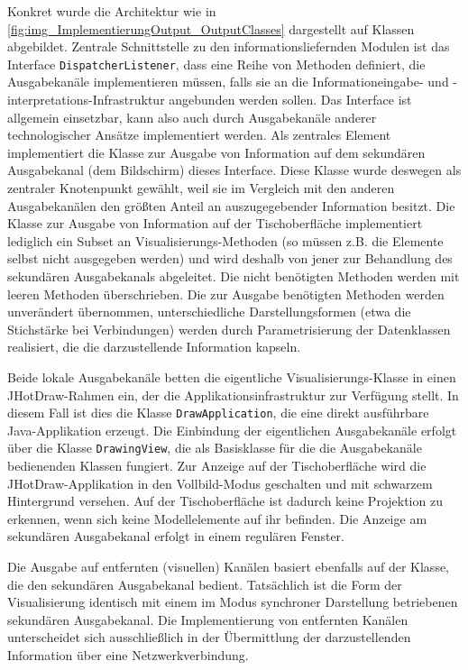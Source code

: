 Konkret wurde die Architektur wie in \ref{fig:img_ImplementierungOutput_OutputClasses} dargestellt auf Klassen abgebildet. Zentrale Schnittstelle zu den informationsliefernden Modulen ist das Interface \texttt{DispatcherListener}, dass eine Reihe von Methoden definiert, die Ausgabekanäle implementieren müssen, falls sie an die Informationeingabe- und -interpretations-Infrastruktur angebunden werden sollen. Das Interface ist allgemein einsetzbar, kann also auch durch Ausgabekanäle anderer technologischer Ansätze implementiert werden. Als zentrales Element implementiert die Klasse zur Ausgabe von Information auf dem sekundären Ausgabekanal (dem Bildschirm) dieses Interface. Diese Klasse wurde deswegen als zentraler Knotenpunkt gewählt, weil sie im Vergleich mit den anderen Ausgabekanälen den größten Anteil an auszugegebender Information besitzt. Die Klasse zur Ausgabe von Information auf der Tischoberfläche implementiert lediglich ein Subset an Visualisierungs-Methoden (so müssen z.B. die Elemente selbst nicht ausgegeben werden) und wird deshalb von jener zur Behandlung des sekundären Ausgabekanals abgeleitet. Die nicht benötigten Methoden werden mit leeren Methoden überschrieben. Die zur Ausgabe benötigten Methoden werden unverändert übernommen, unterschiedliche Darstellungsformen (etwa die Stichstärke bei Verbindungen) werden durch Parametrisierung der Datenklassen realisiert, die die darzustellende Information kapseln.

Beide lokale Ausgabekanäle betten die eigentliche Visualisierungs-Klasse in einen JHotDraw-Rahmen ein, der die Applikationsinfrastruktur zur Verfügung stellt. In diesem Fall ist dies die Klasse \texttt{DrawApplication}, die eine direkt ausführbare Java-Applikation erzeugt. Die Einbindung der eigentlichen Ausgabekanäle erfolgt über die Klasse \texttt{DrawingView}, die als Basisklasse für die die Ausgabekanäle bedienenden Klassen fungiert. Zur Anzeige auf der Tischoberfläche wird die JHotDraw-Applikation in den Vollbild-Modus geschalten und mit schwarzem Hintergrund versehen. Auf der Tischoberfläche ist dadurch keine Projektion zu erkennen, wenn sich keine Modellelemente auf ihr befinden. Die Anzeige am sekundären Ausgabekanal erfolgt in einem regulären Fenster.

Die Ausgabe auf entfernten (visuellen) Kanälen basiert ebenfalls auf der Klasse, die den sekundären Ausgabekanal bedient. Tatsächlich ist die Form der Visualisierung identisch mit einem im Modus synchroner Darstellung betriebenen sekundären Ausgabekanal. Die Implementierung von entfernten Kanälen unterscheidet sich ausschließlich in der Übermittlung der darzustellenden Information über eine Netzwerkverbindung. 

